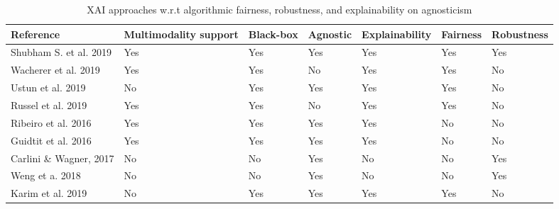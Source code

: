 \begin{table}
    \centering
    \caption{XAI approaches w.r.t algorithmic fairness, robustness, and explainability on agnosticism}
    \label{tab:multimodal_xai_approaches}
    \scriptsize
    \vspace{-2mm}
    \begin{tabular}{l|l|l|l|l|l|l} 
        \hline
        \textbf{Reference}                & \textbf{Multimodality support} & \textbf{Black-box} & \textbf{Agnostic} & \textbf{Explainability} & \textbf{Fairness} & \textbf{Robustness}  \\ 
        \hline
        Shubham S. et al. 2019   & Yes                   & Yes       & Yes            & Yes            & Yes      & Yes         \\ 
        \hline
        Wacherer et al. 2019     & Yes                   & Yes       & No             & Yes            & Yes      & No          \\ 
        \hline
        Ustun et al. 2019        & No                    & Yes       & Yes            & Yes            & Yes      & No          \\ 
        \hline
        Russel et al. 2019       & Yes                   & Yes       & No             & Yes            & Yes      & No          \\ 
        \hline
        Ribeiro et al. 2016      & Yes                   & Yes       & Yes            & Yes            & No       & No          \\ 
        \hline
        Guidtit et al. 2016      & Yes                   & Yes       & Yes            & Yes            & No       & No          \\ 
        \hline
        Carlini \& Wagner, 2017 & No                    & No        & Yes            & No             & No       & Yes         \\ 
        \hline
        Weng et a. 2018          & No                    & No        & Yes            & No             & No       & Yes         \\ 
        \hline
        Karim et al. 2019        & No                    & Yes       & Yes            & Yes            & Yes      & No          \\
        \hline
    \end{tabular}
    \vspace{-4mm}
\end{table}

